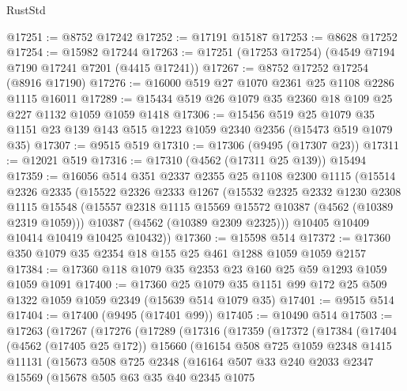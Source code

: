 \begin{lexlean}{RustStd}
\begin{coremodule}
@17251 := @8752 @17242
@17252 := @17191 @15187
@17253 := @8628 @17252
@17254 := @15982 @17244
@17263 := @17251 (@17253 @17254) (@4549 @7194 @7190 @17241 @7201 (@4415 @17241))
@17267 := @8752 @17252 @17254 (@8916 @17190)
@17276 := @16000 @519 @27 @1070 @2361 @25 @1108 @2286 @1115 @16011
@17289 := @15434 @519 @26 @1079 @35 @2360 @18 @109 @25 @227 @1132 @1059 @1059 @1418
@17306 := @15456
    @519
    @25
    @1079
    @35
    @1151
    @23
    @139
    @143
    @515
    @1223
    @1059
    @2340
    @2356
    (@15473 @519 @1079 @35)
@17307 := @9515 @519
@17310 := @17306 (@9495 (@17307 @23))
@17311 := @12021 @519
@17316 := @17310 (@4562 (@17311 @25 @139)) @15494
@17359 := @16056
    @514
    @351
    @2337
    @2355
    @25
    @1108
    @2300
    @1115
    (@15514
      @2326
      @2335
      (@15522
        @2326
        @2333
        @1267
        (@15532
          @2325
          @2332
          @1230
          @2308
          @1115
          @15548
          (@15557 @2318 @1115 @15569 @15572 @10387 (@4562 (@10389 @2319 @1059)))
          @10387
          (@4562 (@10389 @2309 @2325)))
        @10405
        @10409
        @10414
        @10419
        @10425
        @10432))
@17360 := @15598 @514
@17372 := @17360 @350 @1079 @35 @2354 @18 @155 @25 @461 @1288 @1059 @1059 @2157
@17384 := @17360 @118 @1079 @35 @2353 @23 @160 @25 @59 @1293 @1059 @1059 @1091
@17400 := @17360
    @25
    @1079
    @35
    @1151
    @99
    @172
    @25
    @509
    @1322
    @1059
    @1059
    @2349
    (@15639 @514 @1079 @35)
@17401 := @9515 @514
@17404 := @17400 (@9495 (@17401 @99))
@17405 := @10490 @514
@17503 := @17263
    (@17267
      (@17276
        (@17289
          (@17316
            (@17359
              (@17372
                (@17384
                  (@17404
                    (@4562 (@17405 @25 @172))
                    @15660
                    (@16154
                      @508
                      @725
                      @1059
                      @2348
                      @1415
                      @11131
                      (@15673
                        @508
                        @725
                        @2348
                        (@16164
                          @507
                          @33
                          @240
                          @2033
                          @2347
                          @15569
                          (@15678
                            @505
                            @63
                            @35
                            @40
                            @2345
                            @1075

\end{coremodule}
\end{lexlean}
